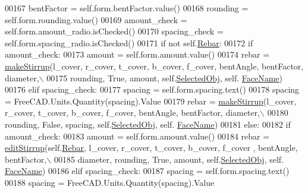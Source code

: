 \begin{DoxyCode}
00167         bentFactor = self.form.bentFactor.value()
00168         rounding = self.form.rounding.value()
00169         amount\_check = self.form.amount\_radio.isChecked()
00170         spacing\_check = self.form.spacing\_radio.isChecked()
00171         \textcolor{keywordflow}{if} \textcolor{keywordflow}{not} self.\hyperlink{classStirrup_1_1__StirrupTaskPanel_a004a341f992f38ca54893edf92f85faa}{Rebar}:
00172             \textcolor{keywordflow}{if} amount\_check:
00173                 amount = self.form.amount.value()
00174                 rebar = \hyperlink{namespaceStirrup_a705fc121e2af9c8ac05eb299f4fb9f2f}{makeStirrup}(l\_cover, r\_cover, t\_cover, b\_cover, f\_cover, bentAngle, 
      bentFactor, diameter,\(\backslash\)
00175                     rounding, \textcolor{keyword}{True}, amount, self.\hyperlink{classStirrup_1_1__StirrupTaskPanel_a25d8b984bd2817ec46c1375b6bec647d}{SelectedObj}, self.
      \hyperlink{classStirrup_1_1__StirrupTaskPanel_a8c01c4e8108c6aaad15394072b188730}{FaceName})
00176             \textcolor{keywordflow}{elif} spacing\_check:
00177                 spacing = self.form.spacing.text()
00178                 spacing = FreeCAD.Units.Quantity(spacing).Value
00179                 rebar = \hyperlink{namespaceStirrup_a705fc121e2af9c8ac05eb299f4fb9f2f}{makeStirrup}(l\_cover, r\_cover, t\_cover, b\_cover, f\_cover, bentAngle, 
      bentFactor, diameter,\(\backslash\)
00180                     rounding, \textcolor{keyword}{False}, spacing, self.\hyperlink{classStirrup_1_1__StirrupTaskPanel_a25d8b984bd2817ec46c1375b6bec647d}{SelectedObj}, self.
      \hyperlink{classStirrup_1_1__StirrupTaskPanel_a8c01c4e8108c6aaad15394072b188730}{FaceName})
00181         \textcolor{keywordflow}{else}:
00182             \textcolor{keywordflow}{if} amount\_check:
00183                 amount = self.form.amount.value()
00184                 rebar = \hyperlink{namespaceStirrup_a1f6d278ace7fe116895dba342e2a3573}{editStirrup}(self.\hyperlink{classStirrup_1_1__StirrupTaskPanel_a004a341f992f38ca54893edf92f85faa}{Rebar}, l\_cover, r\_cover, t\_cover, b\_cover, f\_cover
      , bentAngle, bentFactor,\(\backslash\)
00185                     diameter, rounding, \textcolor{keyword}{True}, amount, self.\hyperlink{classStirrup_1_1__StirrupTaskPanel_a25d8b984bd2817ec46c1375b6bec647d}{SelectedObj}, self.
      \hyperlink{classStirrup_1_1__StirrupTaskPanel_a8c01c4e8108c6aaad15394072b188730}{FaceName})
00186             \textcolor{keywordflow}{elif} spacing\_check:
00187                 spacing = self.form.spacing.text()
00188                 spacing = FreeCAD.Units.Quantity(spacing).Value

\end{DoxyCode}
